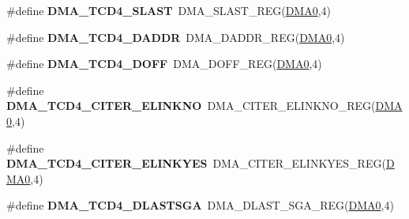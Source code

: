 \begin{DoxyCompactItemize}
\item 
\#define {\bfseries D\+M\+A\+\_\+\+T\+C\+D4\+\_\+\+S\+L\+A\+ST}~D\+M\+A\+\_\+\+S\+L\+A\+S\+T\+\_\+\+R\+EG(\hyperlink{group__DMA__Peripheral__Access__Layer_ga4103044f9ca209772f513dc694513ffb}{D\+M\+A0},4)\hypertarget{group__DMA__Register__Accessor__Macros_gac9552b10b44987816c32f2122c2f6dc7}{}\label{group__DMA__Register__Accessor__Macros_gac9552b10b44987816c32f2122c2f6dc7}

\item 
\#define {\bfseries D\+M\+A\+\_\+\+T\+C\+D4\+\_\+\+D\+A\+D\+DR}~D\+M\+A\+\_\+\+D\+A\+D\+D\+R\+\_\+\+R\+EG(\hyperlink{group__DMA__Peripheral__Access__Layer_ga4103044f9ca209772f513dc694513ffb}{D\+M\+A0},4)\hypertarget{group__DMA__Register__Accessor__Macros_gad344471a51f038a6669dbb0d31f8406c}{}\label{group__DMA__Register__Accessor__Macros_gad344471a51f038a6669dbb0d31f8406c}

\item 
\#define {\bfseries D\+M\+A\+\_\+\+T\+C\+D4\+\_\+\+D\+O\+FF}~D\+M\+A\+\_\+\+D\+O\+F\+F\+\_\+\+R\+EG(\hyperlink{group__DMA__Peripheral__Access__Layer_ga4103044f9ca209772f513dc694513ffb}{D\+M\+A0},4)\hypertarget{group__DMA__Register__Accessor__Macros_gace552f45c71998efe2fe0ae26939f548}{}\label{group__DMA__Register__Accessor__Macros_gace552f45c71998efe2fe0ae26939f548}

\item 
\#define {\bfseries D\+M\+A\+\_\+\+T\+C\+D4\+\_\+\+C\+I\+T\+E\+R\+\_\+\+E\+L\+I\+N\+K\+NO}~D\+M\+A\+\_\+\+C\+I\+T\+E\+R\+\_\+\+E\+L\+I\+N\+K\+N\+O\+\_\+\+R\+EG(\hyperlink{group__DMA__Peripheral__Access__Layer_ga4103044f9ca209772f513dc694513ffb}{D\+M\+A0},4)\hypertarget{group__DMA__Register__Accessor__Macros_ga11418abcfba691b0c95b6996829e4398}{}\label{group__DMA__Register__Accessor__Macros_ga11418abcfba691b0c95b6996829e4398}

\item 
\#define {\bfseries D\+M\+A\+\_\+\+T\+C\+D4\+\_\+\+C\+I\+T\+E\+R\+\_\+\+E\+L\+I\+N\+K\+Y\+ES}~D\+M\+A\+\_\+\+C\+I\+T\+E\+R\+\_\+\+E\+L\+I\+N\+K\+Y\+E\+S\+\_\+\+R\+EG(\hyperlink{group__DMA__Peripheral__Access__Layer_ga4103044f9ca209772f513dc694513ffb}{D\+M\+A0},4)\hypertarget{group__DMA__Register__Accessor__Macros_ga5f9ae40aad0685169fe662966b2093e7}{}\label{group__DMA__Register__Accessor__Macros_ga5f9ae40aad0685169fe662966b2093e7}

\item 
\#define {\bfseries D\+M\+A\+\_\+\+T\+C\+D4\+\_\+\+D\+L\+A\+S\+T\+S\+GA}~D\+M\+A\+\_\+\+D\+L\+A\+S\+T\+\_\+\+S\+G\+A\+\_\+\+R\+EG(\hyperlink{group__DMA__Peripheral__Access__Layer_ga4103044f9ca209772f513dc694513ffb}{D\+M\+A0},4)\hypertarget{group__DMA__Register__Accessor__Macros_ga087e361e7331f84abef82e41a3c6961f}{}\label{group__DMA__Register__Accessor__Macros_ga087e361e7331f84abef82e41a3c6961f}


\end{DoxyCompactItemize}
